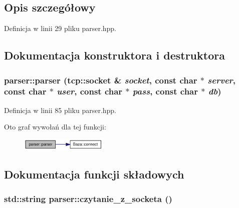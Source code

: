 \subsection{Opis szczegółowy}


Definicja w linii 29 pliku parser.hpp.

\subsection{Dokumentacja konstruktora i destruktora}
\hypertarget{a00005_9f881c43df7d37da2d6dee1e89ee5f1f}{
\subsubsection[{parser}]{\setlength{\rightskip}{0pt plus 5cm}parser::parser (tcp::socket \& {\em socket}, \/  const char $\ast$ {\em server}, \/  const char $\ast$ {\em user}, \/  const char $\ast$ {\em pass}, \/  const char $\ast$ {\em db})}}
\label{dd/dad/a00005_9f881c43df7d37da2d6dee1e89ee5f1f}




Definicja w linii 85 pliku parser.hpp.

Oto graf wywołań dla tej funkcji:\nopagebreak
\begin{figure}[H]
\begin{center}
\leavevmode
\includegraphics[width=118pt]{dd/dad/a00005_9f881c43df7d37da2d6dee1e89ee5f1f_cgraph}
\end{center}
\end{figure}


\subsection{Dokumentacja funkcji składowych}
\hypertarget{a00005_272ecc740702b4f48efdb8469b414b24}{
\subsubsection[{czytanie\_\-z\_\-socketa}]{\setlength{\rightskip}{0pt plus 5cm}std::string parser::czytanie\_\-z\_\-socketa ()}}
\label{dd/dad/a00005_272ecc740702b4f48efdb8469b414b24}


